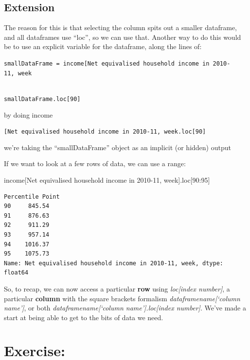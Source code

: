 \documentclass[
  letterpaper,
  DIV=11,
  numbers=noendperiod]{scrreprt}
\newenvironment{Shaded}{\begin{snugshade}}{\end{snugshade}}
\newcommand{\DecValTok}[1]{\textcolor[rgb]{0.68,0.00,0.00}{#1}}
\newcommand{\NormalTok}[1]{\textcolor[rgb]{0.00,0.23,0.31}{#1}}
\newcommand{\StringTok}[1]{\textcolor[rgb]{0.13,0.47,0.30}{#1}}
\begin{document}
\hypertarget{extension}{%
\subsection{Extension}\label{extension}}

The reason for this is that selecting the column spits out a smaller
dataframe, and all dataframes use ``loc'', so we can use that. Another
way to do this would be to use an explicit variable for the dataframe,
along the lines of:

\texttt{smallDataFrame\ =\ income{[}\textquotesingle{}Net\ equivalised\ household\ income\ in\ 2010-11,\ week\textquotesingle{}{]}}\strut \\
\texttt{smallDataFrame.loc{[}90{]}}

by doing income

\texttt{{[}\textquotesingle{}Net\ equivalised\ household\ income\ in\ 2010-11,\ week\textquotesingle{}{]}.loc{[}90{]}}

we're taking the ``smallDataFrame'' object as an implicit (or hidden)
output

If we want to look at a few rows of data, we can use a range:

\begin{Shaded}
\begin{Highlighting}[]
\NormalTok{income[}\StringTok{\textquotesingle{}Net equivalised household income in 2010{-}11, week\textquotesingle{}}\NormalTok{].loc[}\DecValTok{90}\NormalTok{:}\DecValTok{95}\NormalTok{]}
\end{Highlighting}
\end{Shaded}

\begin{verbatim}
Percentile Point
90     845.54
91     876.63
92     911.29
93     957.14
94    1016.37
95    1075.73
Name: Net equivalised household income in 2010-11, week, dtype: float64
\end{verbatim}

So, to recap, we can now access a particular \textbf{row} using
\emph{loc{[}index number{]}}, a particular \textbf{column} with the
square brackets formalism \emph{dataframename{[}`column name'{]}}, or
both \emph{dataframename{[}`column name'{]}.loc{[}index number{]}}.
We've made a start at being able to get to the bits of data we need.

\hypertarget{exercise}{%
\section{Exercise:}\label{exercise}}
\end{document}
